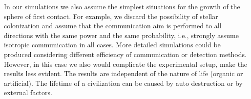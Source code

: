 \documentclass[crop]{CSLB}
\newcommand{\cetis}{CCNs}
\begin{document}

%
%





In our simulations we also assume the simplest situations for the
growth of the sphere of first contact.
%
For example, we discard the possibility of stellar colonization
\citep[e.g.][]{newman_galactic_1981, walters_interstellar_1980,
starling_virulence_2013, barlow_galactic_2012, jeong_large_2000,
maccone_mathematical_2011} and assume that the communication aim is
performed to all directions with the same power and the same
probability, i.e., strongly assume isotropic communication in all
cases.
%
More detailed simulations could be produced considering different
efficiency of communication or detection methods.
%
However, in this case we also would complicate the experimental setup,
make the results less evident.
%
The results are independent of the nature of life (organic or
artificial).
%
The lifetime of a civilization can be caused by auto destruction or by
external factors.
\end{document}

